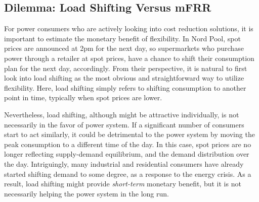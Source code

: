



\IEEEpubidadjcol

\vspace{-1mm}
\subsection{Dilemma: Load Shifting Versus mFRR}
%
For power consumers who are actively looking into cost reduction solutions, it is important to estimate the monetary benefit of flexibility. In Nord Pool, spot prices are announced at 2pm for the next day, so supermarkets who purchase power through a retailer at  spot prices, have a chance to shift their consumption plan for the next day, accordingly. From their perspective, it is natural to first look into load shifting as the most obvious and straightforward way to utilize flexibility. Here, load shifting simply refers to shifting consumption to another point in time, typically when spot prices are lower.

Nevertheless, load shifting, although might be attractive individually, is not necessarily in the favor of power system.
If a significant number of consumers start to act similarly, it could be detrimental to the power system by moving the peak consumption to a different time of the day. In this case, spot prices are no longer reflecting supply-demand equilibrium, and the demand distribution over the day.
Intriguingly, many industrial and residential consumers have already started shifting demand to some degree, as a response to the energy crisis.
As a result, load shifting might provide \textit{short-term} monetary benefit, but it is not necessarily helping the power system in the long run.

